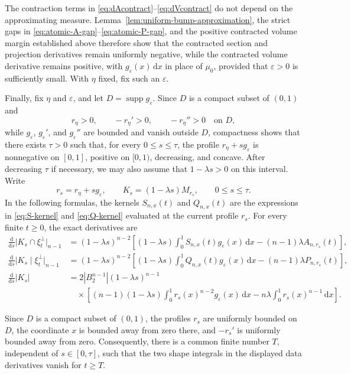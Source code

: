 \documentclass[11pt]{article}
\theoremstyle{remark}
\newcommand{\dd}{\,\mathrm{d}}
\begin{document}
The contraction terms in \eqref{eq:dAcontract}--\eqref{eq:dVcontract} do
not depend on the approximating measure.  Lemma~\ref{lem:uniform-bump-approximation},
the strict gaps in \eqref{eq:atomic-A-gap}--\eqref{eq:atomic-P-gap}, and
the positive contracted volume margin established above therefore show
that the contracted section and projection derivatives remain uniformly
negative, while the contracted volume derivative remains positive, with
$g_\varepsilon(x)\dd x$ in place of $\mu_0$, provided that
$\varepsilon>0$ is sufficiently small.
 With $\eta$ fixed, fix such an $\varepsilon$.
 
Finally, fix $\eta$ and $\varepsilon$, and let
$D=\operatorname{supp}g_\varepsilon$.  Since $D$ is a compact subset of
$(0,1)$ and
\[
 r_\eta>0,\qquad -r_\eta'>0,\qquad -r_\eta''>0
 \quad\text{on }D,
\]
while $g_\varepsilon$, $g_\varepsilon'$, and
$g_\varepsilon''$ are bounded and vanish outside $D$, compactness shows
that there exists $\tau>0$ such that, for every $0\leq s\leq\tau$, the
profile $r_\eta+s g_\varepsilon$ is nonnegative on $[0,1]$, positive on
$[0,1)$, decreasing, and concave.  After decreasing $\tau$ if necessary,
we may also assume that $1-\lambda s>0$ on this interval.  Write
\[
 r_s=r_\eta+s g_\varepsilon,
 \qquad
 K_s=(1-\lambda s)M_{r_s},
 \qquad 0\leq s\leq\tau.
\]
In the following formulas, the kernels $S_{n,x}(t)$ and $Q_{n,x}(t)$ are
the expressions in \eqref{eq:S-kernel} and \eqref{eq:Q-kernel} evaluated
at the current profile $r_s$.  For every finite $t\geq0$, the exact
derivatives are
\begin{align*}
 \frac{\mathrm d}{\mathrm ds}
 \bigl|K_s\cap\xi_t^\perp\bigr|_{n-1}
 &=(1-\lambda s)^{n-2}
 \left[
  (1-\lambda s)\int_0^1S_{n,x}(t)g_\varepsilon(x)\dd x
  -(n-1)\lambda A_{n,r_s}(t)
 \right],\\
 \frac{\mathrm d}{\mathrm ds}
 \bigl|K_s\mid\xi_t^\perp\bigr|_{n-1}
 &=(1-\lambda s)^{n-2}
 \left[
  (1-\lambda s)\int_0^1Q_{n,x}(t)g_\varepsilon(x)\dd x
  -(n-1)\lambda P_{n,r_s}(t)
 \right],\\
 \frac{\mathrm d}{\mathrm ds}|K_s|
 &=2|B_2^{n-1}|(1-\lambda s)^{n-1}\\
 &\quad{}\times
 \left[
  (n-1)(1-\lambda s)
  \int_0^1r_s(x)^{n-2}g_\varepsilon(x)\dd x
  -n\lambda\int_0^1r_s(x)^{n-1}\dd x
 \right].
\end{align*}

Since $D$ is a compact subset of $(0,1)$, the profiles $r_s$ are uniformly
bounded on $D$, the coordinate $x$ is bounded away from zero there, and
$-r_s'$ is uniformly bounded away from zero.  Consequently, there is a
common finite number $T$, independent of $s\in[0,\tau]$, such that the two
shape integrals in the displayed data derivatives vanish for $t\geq T$.
\end{document}
